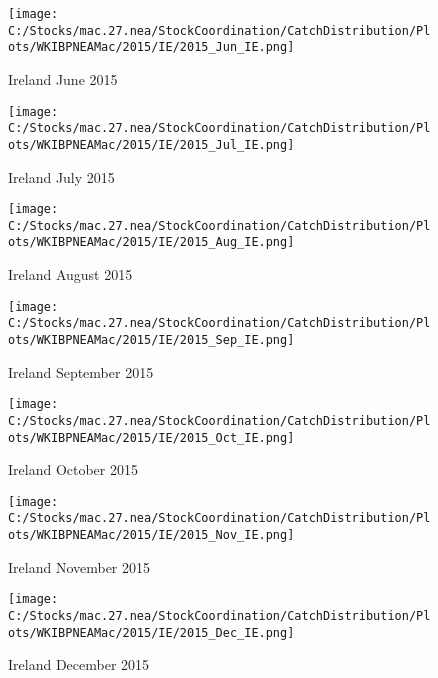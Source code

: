 \documentclass{article}
\begin{document}
\begin{figure}
	\centering
		\texttt{[image: C:/Stocks/mac.27.nea/StockCoordination/CatchDistribution/Plots/WKIBPNEAMac/2015/IE/2015\_Jun\_IE.png]}
	\caption{Ireland June 2015}
	\label{fig:2015_Jun_IE}
\end{figure}

\begin{figure}
	\centering
		\texttt{[image: C:/Stocks/mac.27.nea/StockCoordination/CatchDistribution/Plots/WKIBPNEAMac/2015/IE/2015\_Jul\_IE.png]}
	\caption{Ireland July 2015}
	\label{fig:2015_Jul_IE}
\end{figure}

\begin{figure}
	\centering
		\texttt{[image: C:/Stocks/mac.27.nea/StockCoordination/CatchDistribution/Plots/WKIBPNEAMac/2015/IE/2015\_Aug\_IE.png]}
	\caption{Ireland August 2015}
	\label{fig:2015_Aug_IE}
\end{figure}

\begin{figure}
	\centering
		\texttt{[image: C:/Stocks/mac.27.nea/StockCoordination/CatchDistribution/Plots/WKIBPNEAMac/2015/IE/2015\_Sep\_IE.png]}
	\caption{Ireland September 2015}
	\label{fig:2015_Sep_IE}
\end{figure}

\begin{figure}
	\centering
		\texttt{[image: C:/Stocks/mac.27.nea/StockCoordination/CatchDistribution/Plots/WKIBPNEAMac/2015/IE/2015\_Oct\_IE.png]}
	\caption{Ireland October 2015}
	\label{fig:2015_Oct_IE}
\end{figure}

\begin{figure}
	\centering
		\texttt{[image: C:/Stocks/mac.27.nea/StockCoordination/CatchDistribution/Plots/WKIBPNEAMac/2015/IE/2015\_Nov\_IE.png]}
	\caption{Ireland November 2015}
	\label{fig:2015_Nov_IE}
\end{figure}

\begin{figure}
	\centering
		\texttt{[image: C:/Stocks/mac.27.nea/StockCoordination/CatchDistribution/Plots/WKIBPNEAMac/2015/IE/2015\_Dec\_IE.png]}
	\caption{Ireland December 2015}
	\label{fig:2015_Dec_IE}
\end{figure}

\clearpage

\newpage
\end{document}

